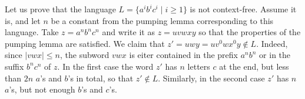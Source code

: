

\setcounter{section}{7}
\setcounter{subsection}{2}
\setcounter{dfn}{3}

\begin{exl}
Let us prove that the language $L = \{a^ib^ic^i \mid i \ge 1\}$ is not context-free.
Assume it is, and let $n$ be a constant from the pumping lemma corresponding to this language.
Take $z = a^nb^nc^n$ and write it as $z = uvwxy$ so that the properties of the pumping lemma are satisfied.
We claim that $z' = uwy = uv^0wx^0y \notin L$.
Indeed, since $|vwx| \le n$, the subword $vwx$ is eiter contained in the prefix $a^nb^n$ or in the suffix $b^nc^n$ of $z$.
In the first case the word $z'$ has $n$ letters $c$ at the end, but less than $2n$ $a$'s and $b$'s in total, so that $z' \notin L$.
Similarly, in the second case $z'$ has $n$ $a$'s, but not enough $b$'s and $c$'s.
\end{exl}


